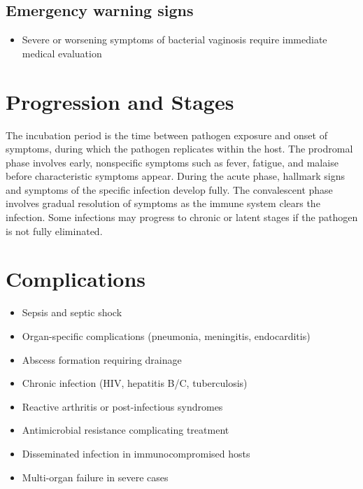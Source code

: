 \subsection{Emergency warning signs}
\begin{itemize}[noitemsep]
  \item Severe or worsening symptoms of bacterial vaginosis require immediate medical evaluation
\end{itemize}
\section{Progression and Stages}
The incubation period is the time between pathogen exposure and onset of symptoms, during which the pathogen replicates within the host. The prodromal phase involves early, nonspecific symptoms such as fever, fatigue, and malaise before characteristic symptoms appear. During the acute phase, hallmark signs and symptoms of the specific infection develop fully. The convalescent phase involves gradual resolution of symptoms as the immune system clears the infection. Some infections may progress to chronic or latent stages if the pathogen is not fully eliminated.
\section{Complications}
\begin{itemize}[noitemsep]
  \item Sepsis and septic shock
  \item Organ-specific complications (pneumonia, meningitis, endocarditis)
  \item Abscess formation requiring drainage
  \item Chronic infection (HIV, hepatitis B/C, tuberculosis)
  \item Reactive arthritis or post-infectious syndromes
  \item Antimicrobial resistance complicating treatment
  \item Disseminated infection in immunocompromised hosts
  \item Multi-organ failure in severe cases
\end{itemize}
